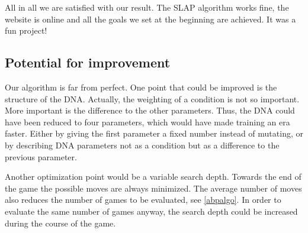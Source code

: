 All in all we are satisfied with our result. The SLAP algorithm works fine, the website is online and all the goals we set at the beginning are achieved. It was a fun project!

\subsection{Potential for improvement}
Our algorithm is far from perfect. One point that could be improved is the structure of the DNA. Actually, the weighting of a condition is not so important. More important is the difference to the other parameters. Thus, the DNA could have been reduced to four parameters, which would have made training an era faster. Either by giving the first parameter a fixed number instead of mutating, or by describing DNA parameters not as a condition but as a difference to the previous parameter.

Another optimization point would be a variable search depth. Towards the end of the game the possible moves are always minimized. The average number of moves also reduces the number of games to be evaluated, see \autoref{abpalgo}. In order to evaluate the same number of games anyway, the search depth could be increased during the course of the game.
